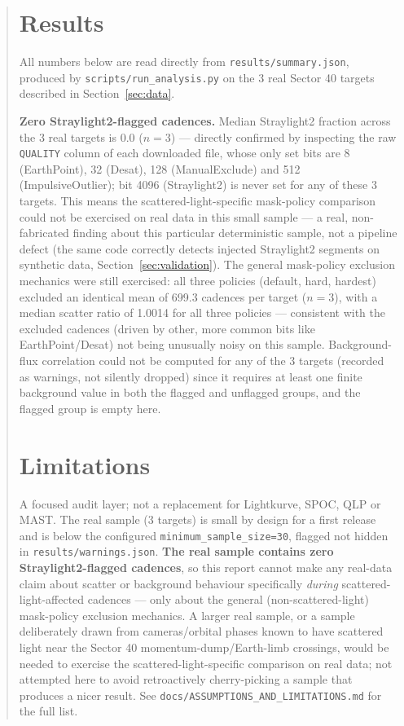 \documentclass[11pt]{article}
\begin{document}
\begin{abstract}
\section{Results}
\label{sec:results}
All numbers below are read directly from \texttt{results/summary.json},
produced by \texttt{scripts/run\_analysis.py} on the 3 real Sector 40
targets described in Section~\ref{sec:data}.

\textbf{Zero Straylight2-flagged cadences.} Median Straylight2 fraction
across the 3 real targets is $0.0$ ($n=3$) --- directly confirmed by
inspecting the raw \texttt{QUALITY} column of each downloaded file, whose
only set bits are 8 (EarthPoint), 32 (Desat), 128 (ManualExclude) and 512
(ImpulsiveOutlier); bit 4096 (Straylight2) is never set for any of these 3
targets. This means the scattered-light-specific mask-policy comparison
could not be exercised on real data in this small sample --- a real,
non-fabricated finding about this particular deterministic sample, not a
pipeline defect (the same code correctly detects injected Straylight2
segments on synthetic data, Section~\ref{sec:validation}). The general
mask-policy exclusion mechanics were still exercised: all three policies
(default, hard, hardest) excluded an identical mean of 699.3 cadences per
target ($n=3$), with a median scatter ratio of 1.0014 for all three
policies --- consistent with the excluded cadences (driven by other, more
common bits like EarthPoint/Desat) not being unusually noisy on this
sample. Background-flux correlation could not be computed for any of the 3
targets (recorded as warnings, not silently dropped) since it requires at
least one finite background value in both the flagged and unflagged
groups, and the flagged group is empty here.

\section{Limitations}
\label{sec:limitations}
A focused audit layer; not a replacement for Lightkurve, SPOC, QLP or MAST.
The real sample (3 targets) is small by design for a first release and is
below the configured \texttt{minimum\_sample\_size=30}, flagged not hidden
in \texttt{results/warnings.json}. \textbf{The real sample contains zero
Straylight2-flagged cadences}, so this report cannot make any real-data
claim about scatter or background behaviour specifically \emph{during}
scattered-light-affected cadences --- only about the general (non-scattered-light)
mask-policy exclusion mechanics. A larger real sample, or a sample
deliberately drawn from cameras/orbital phases known to have scattered
light near the Sector 40 momentum-dump/Earth-limb crossings, would be
needed to exercise the scattered-light-specific comparison on real data;
not attempted here to avoid retroactively cherry-picking a sample that
produces a nicer result. See \texttt{docs/ASSUMPTIONS\_AND\_LIMITATIONS.md}
for the full list.


\end{abstract}
\end{document}
